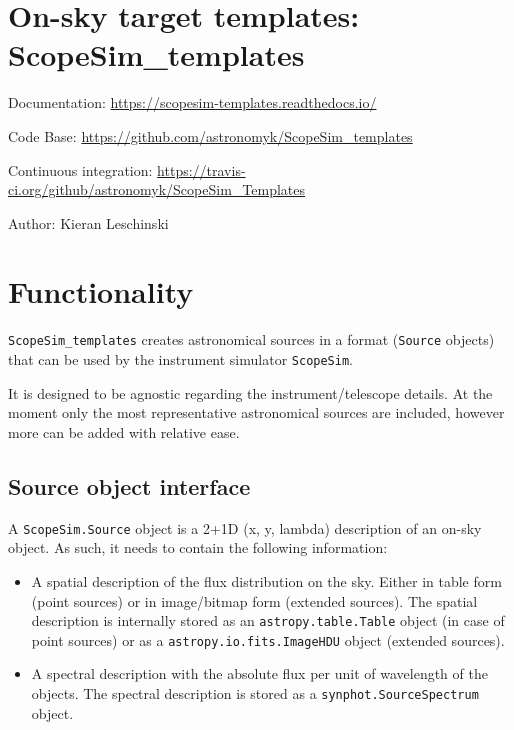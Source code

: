 

\section{On-sky target templates: ScopeSim\_templates%
  \label{on-sky-target-templates-scopesim-templates}%
}

Documentation: \url{https://scopesim-templates.readthedocs.io/}

Code Base: \url{https://github.com/astronomyk/ScopeSim_templates}

Continuous integration: \url{https://travis-ci.org/github/astronomyk/ScopeSim_Templates}

Author: Kieran Leschinski


\section{Functionality%
  \label{functionality}%
}

\texttt{ScopeSim\_templates} creates astronomical sources in a format (\texttt{Source} objects)
that can be used by the instrument simulator \texttt{ScopeSim}.

It is designed to be agnostic regarding the instrument/telescope details. At the moment
only the most representative astronomical sources are included, however more
can be added with relative ease.


\subsection{Source object interface%
  \label{source-object-interface}%
}

A \texttt{ScopeSim.Source} object is a 2+1D (x, y, lambda) description of an on-sky object.
As such, it needs to contain the following information:

\begin{itemize}
\item A spatial description of the flux distribution on the sky. Either in table form (point sources)
or in image/bitmap form (extended sources). The spatial description is internally stored as
an \texttt{astropy.table.Table} object (in case of point sources) or as a \texttt{astropy.io.fits.ImageHDU} object
(extended sources).

\item A spectral description with the absolute flux per unit of wavelength of the objects. The spectral
description is stored as a \texttt{synphot.SourceSpectrum} object.
\end{itemize}

